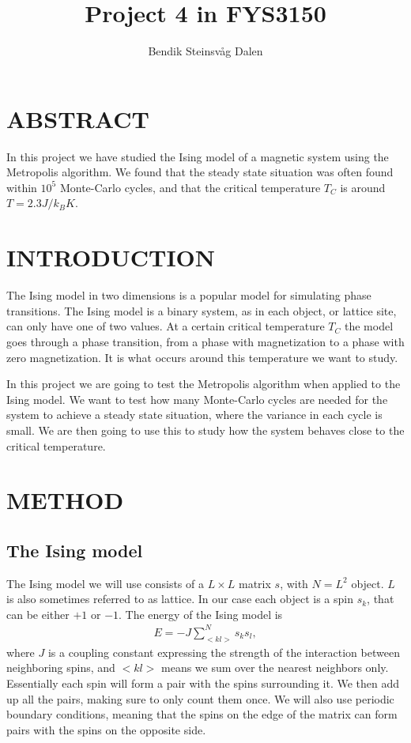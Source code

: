 \documentclass[a4paper]{article}
\title{Project 4 in FYS3150}
\author{Bendik Steinsvåg Dalen}
\let\Oldsection\section
\renewcommand{\section}{\FloatBarrier\Oldsection}
\let\Oldsubsection\subsection
\renewcommand{\subsection}{\FloatBarrier\Oldsubsection}
\begin{document}
\maketitle


\section{ABSTRACT}

In this project we have studied the Ising model of a magnetic system using the Metropolis algorithm. We found that the steady state situation was often found within $10^5$ Monte-Carlo cycles, and that the critical temperature $T_C$ is around $T=2.3 J/k_B K$.

\section{INTRODUCTION}

The Ising model in two dimensions is a popular model for simulating phase transitions. The Ising model is a binary system, as in each object, or lattice site, can only have one of two values. At a certain critical temperature $T_C$ the model goes through a phase transition, from a phase with magnetization to a phase with zero magnetization. It is what occurs around this temperature we want to study. 

In this project we are going to test the Metropolis algorithm when applied to the Ising model. We want to test how many Monte-Carlo cycles are needed for the system to achieve a steady state situation, where the variance in each cycle is small. We are then going to use this to study how the system behaves close to the critical temperature. 

\section{METHOD}

\subsection{The Ising model}

The Ising model we will use consists of a $L\times L$ matrix $s$, with $N=L^2$ object. $L$ is also sometimes referred to as lattice. In our case each object is a spin $s_k$, that can be either $+1$ or $-1$. The energy of the Ising model is
\begin{align}
E = -J\sum_{<kl>}^{N}s_{k}s_{l}, \label{energy}
\end{align}
where $J$ is a coupling constant expressing the strength of the interaction between neighboring spins, and $<kl>$ means we sum over the nearest neighbors only. Essentially each spin will form a pair with the spins surrounding it. We then add up all the pairs, making sure to only count them once. We will also use periodic boundary conditions, meaning that the spins on the edge of the matrix can form pairs with the spins on the opposite side. 
\end{document}
